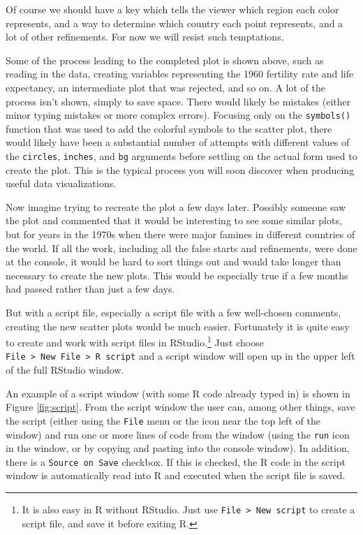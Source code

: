 \documentclass[]{krantz}
\begin{document}
Of course we should have a key which tells the viewer which region each
color represents, and a way to determine which country each point
represents, and a lot of other refinements. For now we will resist such
temptations.

Some of the process leading to the completed plot is shown above, such
as reading in the data, creating variables representing the 1960
fertility rate and life expectancy, an intermediate plot that was
rejected, and so on. A lot of the process isn't shown, simply to save
space. There would likely be mistakes (either minor typing mistakes or
more complex errors). Focusing only on the \texttt{symbols()} function
that was used to add the colorful symbols to the scatter plot, there
would likely have been a substantial number of attempts with different
values of the \texttt{circles}, \texttt{inches}, and \texttt{bg}
arguments before settling on the actual form used to create the plot.
This is the typical process you will soon discover when producing useful
data visualizations.

Now imagine trying to recreate the plot a few days later. Possibly
someone saw the plot and commented that it would be interesting to see
some similar plots, but for years in the 1970s when there were major
famines in different countries of the world. If all the work, including
all the false starts and refinements, were done at the console, it would
be hard to sort things out and would take longer than necessary to
create the new plots. This would be especially true if a few months had
passed rather than just a few days.

But with a script file, especially a script file with a few well-chosen
comments, creating the new scatter plots would be much easier.
Fortunately it is quite easy to create and work with script files in
RStudio.\footnote{It is also easy in R without RStudio. Just use
  \texttt{File\ \textgreater{}\ New\ script} to create a script file,
  and save it before exiting R.} Just choose
\texttt{File\ \textgreater{}\ New\ File\ \textgreater{}\ R\ script} and
a script window will open up in the upper left of the full RStudio
window.

An example of a script window (with some R code already typed in) is
shown in Figure \ref{fig:script}. From the script window the user can,
among other things, save the script (either using the \texttt{File} menu
or the icon near the top left of the window) and run one or more lines
of code from the window (using the \texttt{run} icon in the window, or
by copying and pasting into the console window). In addition, there is a
\texttt{Source\ on\ Save} checkbox. If this is checked, the R code in
the script window is automatically read into R and executed when the
script file is saved.
\end{document}
